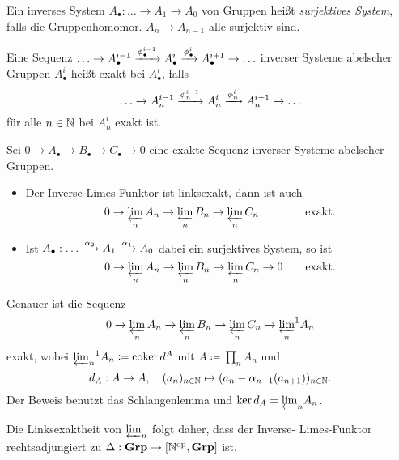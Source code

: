 \documentclass{cheat-sheet}
\DeclareMathOperator{\coker}{coker} %
\newcommand{\Grp}{\mathbf{Grp}} %
\newcommand{\op}{\mathrm{op}} %
\begin{document}


\begin{defn}
  Ein inverses System $A_\bullet : \ldots \to A_1 \to A_0$ von Gruppen heißt \emph{surjektives System}, falls die Gruppenhomomor. $A_n \to A_{n-1}$ alle surjektiv sind.
\end{defn}

\begin{defn}
  Eine Sequenz $\ldots \to A_\bullet^{i-1} \xrightarrow{\phi_\bullet^{i-1}} A_\bullet^i \xrightarrow{\phi_\bullet^i} A_\bullet^{i+1} \to \ldots$ inverser Systeme abelscher Gruppen $A_\bullet^i$ heißt exakt bei $A_\bullet^i$, falls
  \[
    \ldots \to A_n^{i-1} \xrightarrow{\phi_n^{i-1}} A_n^i \xrightarrow{\phi_n^i} A_n^{i+1} \to \ldots
  \]
  für alle $n \in \mathbb{N}$ bei $A_n^i$ exakt ist.
\end{defn}

\begin{prop}
  Sei $0 \to A_\bullet \to B_\bullet \to C_\bullet \to 0$ eine exakte Sequenz inverser Systeme abelscher Gruppen.
  \begin{itemize}
    \item Der Inverse-Limes-Funktor ist linksexakt, \dh{} dann ist auch
    \[
      0 \to \varprojlim_n A_n \to \varprojlim_n B_n \to \varprojlim_n C_n \phantom{\to 0}\,\, \qquad
      \text{exakt.}
    \]
    \item Ist $A_\bullet : \ldots \xrightarrow{\alpha_2} A_1 \xrightarrow{\alpha_1} A_0$ dabei ein surjektives System, so ist
    \[
      0 \to \varprojlim_n A_n \to \varprojlim_n B_n \to \varprojlim_n C_n \to 0 \qquad
      \text{exakt.}
    \]
  \end{itemize}
\end{prop}

\begin{bem}
  Genauer ist die Sequenz
  \[
    0 \to \varprojlim_n A_n \to \varprojlim_n B_n \to \varprojlim_n C_n \to {\varprojlim_n}^1 A_n
  \]
  exakt, wobei ${\varprojlim_n}^1 A_n \coloneqq \coker d^A$ mit $A \coloneqq \prod_n A_n$ und
  \[
    d_A : A \to A, \quad
    (a_n)_{n \in \mathbb{N}} \mapsto (a_n - \alpha_{n+1}(a_{n+1}))_{n \in \mathbb{N}}.
  \]
  Der Beweis benutzt das Schlangenlemma und $\ker d_A = {\varprojlim}_n A_n$.
\end{bem}

\begin{bem}
  Die Linksexaktheit von ${\varprojlim}_n$ folgt daher, dass der Inverse- Limes-Funktor rechtsadjungiert zu $\Delta : \Grp \to [\N^\op, \Grp]$ ist.
\end{bem}
\end{document}
